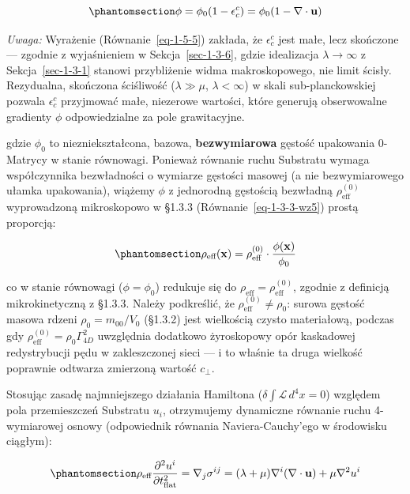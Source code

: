 \documentclass[
  polish,
  letterpaper,
  DIV=11,
  numbers=noendperiod,
  oneside]{scrartcl}
\begin{document}
\begin{equation}\protect\phantomsection\label{eq-1-5-5}{\phi = \phi_0 (1 - \epsilon^c_c) = \phi_0 (1 - \nabla \cdot \mathbf{u})}\end{equation}

\emph{Uwaga:} Wyrażenie (Równanie~\ref{eq-1-5-5}) zakłada, że
\(\epsilon^c_c\) jest małe, lecz skończone --- zgodnie z wyjaśnieniem w
Sekcja~\ref{sec-1-3-6}, gdzie idealizacja \(\lambda\to\infty\) z
Sekcja~\ref{sec-1-3-1} stanowi przybliżenie widma makroskopowego, nie
limit ścisły. Rezydualna, skończona ściśliwość (\(\lambda\gg\mu\),
\(\lambda<\infty\)) w skali sub-planckowskiej pozwala \(\epsilon^c_c\)
przyjmować małe, niezerowe wartości, które generują obserwowalne
gradienty \(\phi\) odpowiedzialne za pole grawitacyjne.

gdzie \(\phi_0\) to niezniekształcona, bazowa, \textbf{bezwymiarowa}
gęstość upakowania 0-Matrycy w stanie równowagi. Ponieważ równanie ruchu
Substratu wymaga współczynnika bezwładności o wymiarze gęstości masowej
(a nie bezwymiarowego ułamka upakowania), wiążemy \(\phi\) z jednorodną
gęstością bezwładną \(\rho_{\text{eff}}^{(0)}\) wyprowadzoną
mikroskopowo w §1.3.3 (Równanie~\ref{eq-1-3-3-wz5}) prostą proporcją:

\begin{equation}\protect\phantomsection\label{eq-1-5-5b}{\rho_{\text{eff}}(\mathbf{x}) = \rho_{\text{eff}}^{(0)} \cdot \frac{\phi(\mathbf{x})}{\phi_0}}\end{equation}

co w stanie równowagi (\(\phi=\phi_0\)) redukuje się do
\(\rho_{\text{eff}}=\rho_{\text{eff}}^{(0)}\), zgodnie z definicją
mikrokinetyczną z §1.3.3. Należy podkreślić, że
\(\rho_{\text{eff}}^{(0)}\neq\rho_0\): surowa gęstość masowa rdzeni
\(\rho_0=m_{00}/V_0\) (§1.3.2) jest wielkością czysto materiałową,
podczas gdy \(\rho_{\text{eff}}^{(0)}=\rho_0\Gamma_{4D}^2\) uwzględnia
dodatkowo żyroskopowy opór kaskadowej redystrybucji pędu w zakleszczonej
sieci --- i to właśnie ta druga wielkość poprawnie odtwarza zmierzoną
wartość \(c_\perp\).

Stosując zasadę najmniejszego działania Hamiltona
(\(\delta \int \mathcal{L} \, d^4x = 0\)) względem pola przemieszczeń
Substratu \(u_i\), otrzymujemy dynamiczne równanie ruchu 4-wymiarowej
osnowy (odpowiednik równania Naviera-Cauchy'ego w środowisku ciągłym):

\begin{equation}\protect\phantomsection\label{eq-1-5-6}{\rho_{\text{eff}} \frac{\partial^2 u^i}{\partial t_{\text{flat}}^2} = \nabla_j \sigma^{ij} = (\lambda + \mu) \nabla^i (\nabla \cdot \mathbf{u}) + \mu \nabla^2 u^i}\end{equation}
\end{document}
